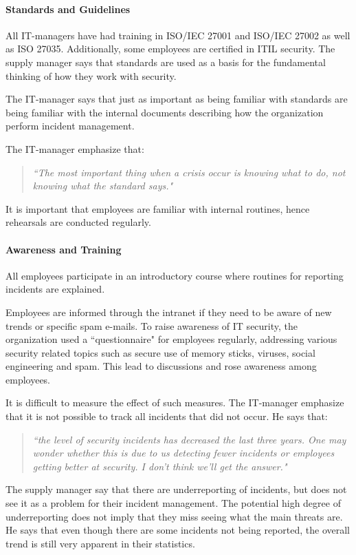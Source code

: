 \paragraph{Standards and Guidelines}
All IT-managers have had training in ISO/IEC 27001 and ISO/IEC 27002 as well as ISO 27035. Additionally, some employees are certified in ITIL security. 
The supply manager says that standards are used as a basis for the fundamental thinking of how they work with security.  

The IT-manager says that just as important as being familiar with standards are being familiar with the internal documents describing how the organization perform incident management. 

The IT-manager emphasize that:
\begin{quote}
\textit{``The most important thing when a crisis occur is knowing what to do, not knowing what the standard says."}
\end{quote}
It is important that employees are familiar with internal routines, hence rehearsals are conducted regularly.

\paragraph{Awareness and Training}

All employees participate in an introductory course where routines for reporting incidents are explained. 

Employees are informed through the intranet if they need to be aware of new trends or specific spam e-mails. To raise awareness of IT security, the organization used a ``questionnaire" for employees regularly, addressing various security related topics such as secure use of memory sticks, viruses, social engineering and spam. This lead to discussions and rose awareness among employees. 

It is difficult to measure the effect of such measures. The IT-manager emphasize that it is not possible to track all incidents that did not occur. He says that:
\begin{quote}
\textit{``the level of security incidents has decreased the last three years. One may wonder whether this is due to us detecting fewer incidents or employees getting better at security. I don't think we'll get the answer."}
\end{quote}

The supply manager say that there are underreporting of incidents, but does not see it as a problem for their incident management. The potential high degree of underreporting does not imply that they miss seeing what the main threats are. He says that even though there are some incidents not being reported, the overall trend is still very apparent in their statistics. 
 
